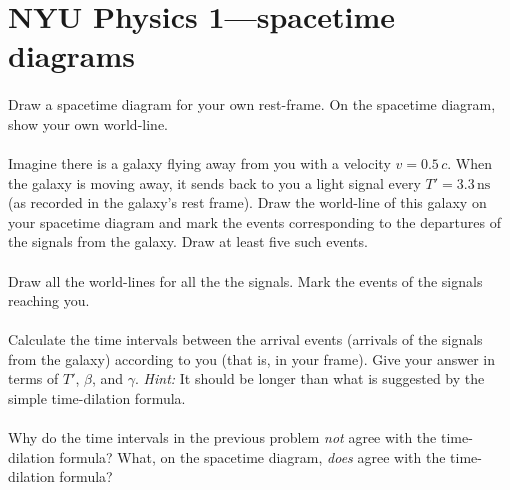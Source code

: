 \documentclass[12pt]{article}
\begin{document}
\renewcommand{\deg}{\mathrm{deg}}
\newcommand{\kg}{\mathrm{kg}}
\newcommand{\m}{\mathrm{m}}
\newcommand{\s}{\mathrm{s}}
\newcommand{\ns}{\mathrm{ns}}
\newcommand{\mps}{\m\,\s^{-1}}
\thispagestyle{empty}

\section*{NYU Physics 1---spacetime diagrams}

\paragraph{\theproblem}%
Draw a spacetime diagram for your own rest-frame.  On the spacetime
diagram, show your own world-line.

\paragraph{\theproblem}%
Imagine there is a galaxy flying away from you with a velocity $v =
0.5\,c$. When the galaxy is moving away, it sends back to you a light
signal every $T'=3.3\,\ns$ (as recorded in the galaxy's rest frame).
Draw the world-line of this galaxy on your spacetime diagram and mark
the events corresponding to the departures of the signals from the
galaxy.  Draw at least five such events.

\paragraph{\theproblem}%
Draw all the world-lines for all the the signals.  Mark the events of
the signals reaching you.

\paragraph{\theproblem}%
Calculate the time intervals between the arrival events (arrivals of
the signals from the galaxy) according to you (that is, in your
frame).  Give your answer in terms of $T'$, $\beta$, and $\gamma$.
\textsl{Hint:} It should be longer than what is suggested by the
simple time-dilation formula.

\paragraph{\theproblem}%
Why do the time intervals in the previous problem \emph{not} agree
with the time-dilation formula?  What, on the spacetime diagram,
\emph{does} agree with the time-dilation formula?
\end{document}
